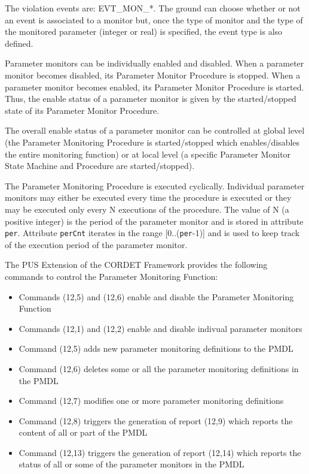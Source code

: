 \documentclass{pnp_article}
\begin{document}
The violation events are: EVT\_MON\_*. The ground can choose whether or not an event is associated to a monitor but, once the type of monitor and the type of the monitored parameter (integer or real) is specified, the event type is also defined.

Parameter monitors can be individually enabled and disabled. When a parameter monitor becomes disabled, its Parameter Monitor Procedure is stopped. When a parameter monitor becomes enabled, its Parameter Monitor Procedure is started. Thus, the enable status of a parameter monitor is given by the started/stopped state of its Parameter Monitor Procedure.

The overall enable status of a parameter monitor can be controlled at global level (the Parameter Monitoring Procedure is started/stopped which enables/disables the entire monitoring function) or at local level (a specific Parameter Monitor State Machine and Procedure are started/stopped).

The Parameter Monitoring Procedure is executed cyclically. Individual parameter monitors may either be executed every time the procedure is executed or they may be executed only every N executions of the procedure. The value of N (a positive integer) is the period of the parameter monitor and is stored in attribute \texttt{per}. Attribute \texttt{perCnt} iterates in the range [0..(\texttt{per}-1)] and is used to keep track of the execution period of the parameter monitor.

The PUS Extension of the CORDET Framework provides the following commands to control the Parameter Monitoring Function:

\begin{itemize}
\item Commands (12,5) and (12,6) enable and disable the Parameter Monitoring Function
\item Commands (12,1) and (12,2) enable and disable indivual parameter monitors
\item Command (12,5) adds new parameter monitoring definitions to the PMDL
\item Command (12,6) deletes some or all the parameter monitoring definitions in the PMDL
\item Command (12,7) modifies one or more parameter monitoring definitions
\item Command (12,8) triggers the generation of report (12,9) which reports the content of all or part of the PMDL
\item Command (12,13) triggers the generation of report (12,14) which reports the status of all or some of the parameter monitors in the PMDL
\end{itemize}
\end{document}
